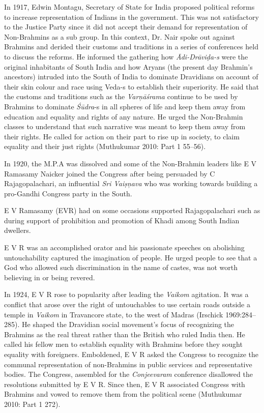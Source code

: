 In 1917, Edwin Montagu, Secretary of State for India proposed political reforms to increase representation of Indians in the government. This was not satisfactory to the Justice Party since it did not accept their demand for representation of Non-Brahmins as a sub group. In this context, Dr. Nair spoke out against Brahmins and derided their customs and traditions in a series of conferences held to discuss the reforms. He informed the gathering how \textit{Ādi-Drāviḍa-s} were the original inhabitants of South India and how Aryans (the present day Brahmin’s ancestors) intruded into the South of India to dominate Dravidians on account of their skin colour and race using Veda-s to establish their superiority. He said that the customs and traditions such as the \textit{Varņāśrama} continue to be used by Brahmins to dominate \textit{Śūdra}-s in all spheres of life and keep them away from education and equality and rights of any nature. He urged the Non-Brahmin classes to understand that such narrative was meant to keep them away from their rights. He called for action on their part to rise up in society, to claim equality and their just rights (Muthukumar 2010: Part 1 55–56).

In 1920, the M.P.A was dissolved and some of the Non-Brahmin leaders like E V Ramasamy Naicker joined the Congress after being persuaded by C Rajagopalachari, an influential \textit{Sri Vaiṣņava }who was working towards building a pro-Gandhi Congress party in the South.

E V Ramasamy (EVR) had on some occasions supported Rajagopalachari such as during support of prohibition and promotion of Khadi among South Indian dwellers.

E V R was an accomplished orator and his passionate speeches on abolishing untouchability captured the imagination of people. He urged people to see that a God who allowed such discrimination in the name of castes, was not worth believing in or being revered.

In 1924, E V R rose to popularity after leading the \textit{Vaikom} agitation. It was a conflict that arose over the right of untouchables to use certain roads outside a temple in \textit{Vaikom} in Travancore state, to the west of Madras (Irschick 1969:284–285). He shaped the Dravidian social movement’s focus of recognizing the Brahmins as the real threat rather than the British who ruled India then. He called his fellow men to establish equality with Brahmins before they sought equality with foreigners. Emboldened, E V R asked the Congress to recognize the communal representation of non-Brahmins in public services and representative bodies. The Congress, assembled for the \textit{Conjeevaram} conference disallowed the resolutions submitted by E V R. Since then, E V R associated Congress with Brahmins and vowed to remove them from the political scene (Muthukumar 2010: Part 1 272).

